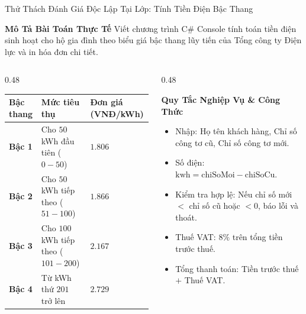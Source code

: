 \documentclass[aspectratio=169, 10pt]{beamer}
\begin{document}
\begin{frame}{Thử Thách Đánh Giá Độc Lập Tại Lớp: Tính Tiền Điện Bậc Thang}
  \begin{block}{\textbf{Mô Tả Bài Toán Thực Tế}}
    Viết chương trình C\# Console tính toán tiền điện sinh hoạt cho hộ gia đình theo biểu giá bậc thang lũy tiến của Tổng công ty Điện lực và in hóa đơn chi tiết.
  \end{block}
  \begin{columns}[T]
    \begin{column}{0.48\textwidth}
      \begin{table}[h]
        \centering
        \scriptsize
        \begin{tabularx}{\textwidth}{p{1.2cm}p{2.3cm}X}
          \toprule
          \textbf{Bậc thang} & \textbf{Mức tiêu thụ} & \textbf{Đơn giá (VNĐ/kWh)} \\
          \midrule
          \textbf{Bậc 1} & Cho $50$ kWh đầu tiên ($0 - 50$) & $1.806$ \\
          \addlinespace
          \textbf{Bậc 2} & Cho $50$ kWh tiếp theo ($51 - 100$) & $1.866$ \\
          \addlinespace
          \textbf{Bậc 3} & Cho $100$ kWh tiếp theo ($101 - 200$) & $2.167$ \\
          \addlinespace
          \textbf{Bậc 4} & Từ kWh thứ $201$ trở lên & $2.729$ \\
          \bottomrule
        \end{tabularx}
      \end{table}
    \end{column}
    \begin{column}{0.48\textwidth}
      \begin{exampleblock}{\textbf{Quy Tắc Nghiệp Vụ \& Công Thức}}
        \begin{itemize}
          \item Nhập: Họ tên khách hàng, Chỉ số công tơ cũ, Chỉ số công tơ mới.
          \item Số điện: $\text{kwh} = \text{chiSoMoi} - \text{chiSoCu}$.
          \item Kiểm tra hợp lệ: Nếu chỉ số mới $<$ chỉ số cũ hoặc $<0$, báo lỗi và thoát.
          \item Thuế VAT: $8\%$ trên tổng tiền trước thuế.
          \item Tổng thanh toán: Tiền trước thuế $+$ Thuế VAT.
        \end{itemize}
      \end{exampleblock}
    \end{column}
  \end{columns}
\end{frame}
\end{document}
